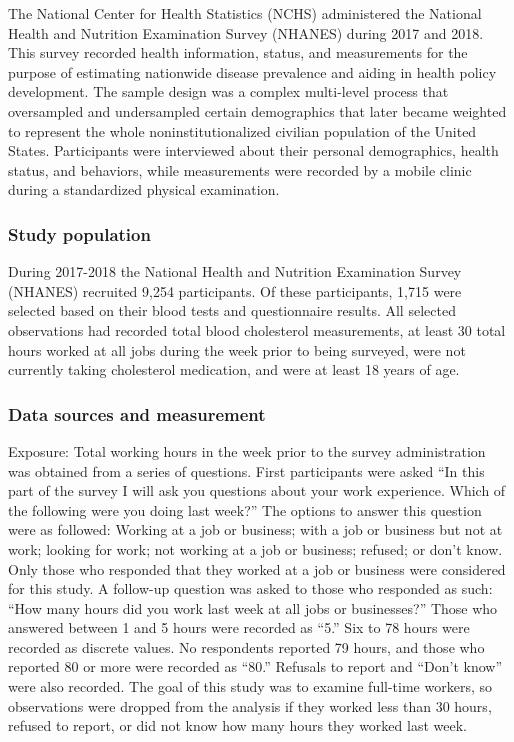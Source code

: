 \documentclass[]{elsarticle} %
\begin{document}
The National Center for Health Statistics (NCHS) administered the
National Health and Nutrition Examination Survey (NHANES) during 2017
and 2018. This survey recorded health information, status, and
measurements for the purpose of estimating nationwide disease prevalence
and aiding in health policy development. The sample design was a complex
multi-level process that oversampled and undersampled certain
demographics that later became weighted to represent the whole
noninstitutionalized civilian population of the United States.
Participants were interviewed about their personal demographics, health
status, and behaviors, while measurements were recorded by a mobile
clinic during a standardized physical examination.

\hypertarget{study-population}{%
\subsubsection{Study population}\label{study-population}}

During 2017-2018 the National Health and Nutrition Examination Survey
(NHANES) recruited 9,254 participants. Of these participants, 1,715 were
selected based on their blood tests and questionnaire results. All
selected observations had recorded total blood cholesterol measurements,
at least 30 total hours worked at all jobs during the week prior to
being surveyed, were not currently taking cholesterol medication, and
were at least 18 years of age.

\hypertarget{data-sources-and-measurement}{%
\subsubsection{Data sources and
measurement}\label{data-sources-and-measurement}}

Exposure: Total working hours in the week prior to the survey
administration was obtained from a series of questions. First
participants were asked ``In this part of the survey I will ask you
questions about your work experience. Which of the following were you
doing last week?'' The options to answer this question were as followed:
Working at a job or business; with a job or business but not at work;
looking for work; not working at a job or business; refused; or don't
know. Only those who responded that they worked at a job or business
were considered for this study. A follow-up question was asked to those
who responded as such: ``How many hours did you work last week at all
jobs or businesses?'' Those who answered between 1 and 5 hours were
recorded as ``5.'' Six to 78 hours were recorded as discrete values. No
respondents reported 79 hours, and those who reported 80 or more were
recorded as ``80.'' Refusals to report and ``Don't know'' were also
recorded. The goal of this study was to examine full-time workers, so
observations were dropped from the analysis if they worked less than 30
hours, refused to report, or did not know how many hours they worked
last week.
\end{document}

